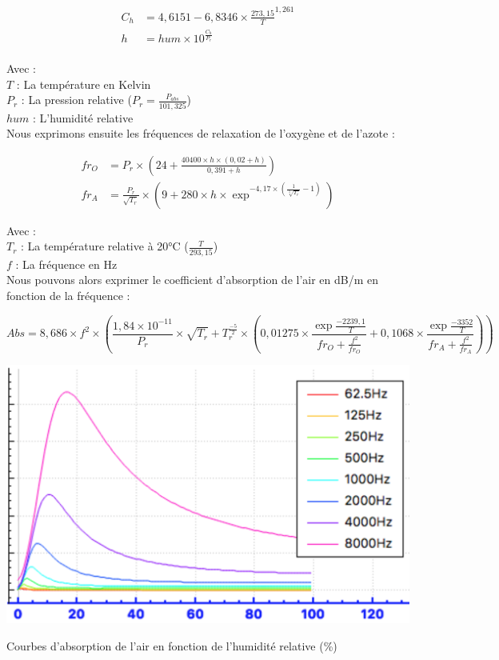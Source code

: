 \begin{align}
	C_h & = 4,6151 - 6,8346 \times \frac{273,15}{T}^{1,261} \\
	h & = hum \times 10^{\frac{C_h}{P_r}} \\ 
\end{align}

Avec : \\
$T$ : La température en Kelvin \\
$P_r$ : La pression relative ($P_r = \frac{P_{abs}}{101,325}$) \\
$hum$ : L'humidité relative \\

Nous exprimons ensuite les fréquences de relaxation de l'oxygène et de l'azote \cite[6.2, eq. 3 et 4]{iso}:

\begin{align}
	fr_O & =  P_r \times (24 + \frac{40400 \times h \times (0,02 + h)}{0,391 + h})  \\
	fr_A & =  \frac{P_r}{\sqrt{T_r}} \times (9 + 280 \times h \times \exp^{-4,17 \times (\frac{1}{\sqrt[3]{T_r}} - 1)})
\end{align}


Avec : \\
$T_r$ : La température relative à 20°C ($\frac{T}{293,15}$) \\
$f$ : La fréquence en Hz \\

Nous pouvons alors exprimer le coefficient d'absorption de l'air en dB/m en fonction de la fréquence  \cite[6.2, eq. 5]{iso} :

\begin{equation}
	Abs = 8,686 \times f^2 \times (\frac{1,84 \times 10^{-11}}{P_r} \times \sqrt{T_r} + T_r^{\frac{-5}{2}} \times (0,01275 \times \frac{\exp{\frac{-2239,1}{T}}}{fr_O + \frac{f^2}{fr_O}} + 0,1068 \times  \frac{\exp{\frac{-3352}{T}}}{fr_A + \frac{f^2}{fr_A}}))
\end{equation}

\begin{figureth}
	\includegraphics[width=0.8\linewidth]{images/courbesAbs}
	\caption{Courbes d'absorption de l'air en fonction de l'humidité relative (\%)}
	\label{courbesAbs}
\end{figureth}

